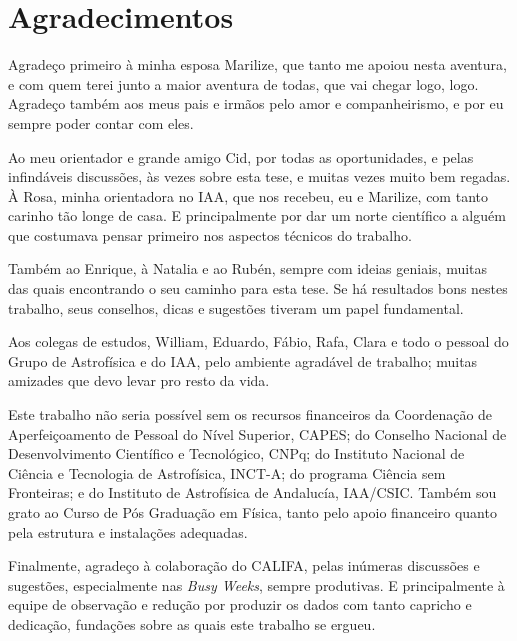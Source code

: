 


\chapter*{Agradecimentos}

Agradeço primeiro à minha esposa Marilize, que tanto me apoiou nesta aventura, e
com quem terei junto a maior aventura de todas, que vai chegar logo, logo. 
Agradeço também aos meus pais e irmãos pelo amor e companheirismo, e por eu
sempre poder contar com eles.

Ao meu orientador e grande amigo Cid, por todas as oportunidades, e pelas
infindáveis discussões, às vezes sobre esta tese, e muitas vezes muito bem
regadas. À Rosa, minha orientadora no IAA, que nos recebeu, eu e Marilize, com
tanto carinho tão longe de casa. E principalmente por dar um norte científico a
alguém que costumava pensar primeiro nos aspectos técnicos do trabalho.

Também ao Enrique, à Natalia e ao Rubén, sempre com ideias geniais, muitas das
quais encontrando o seu caminho para esta tese. Se há resultados bons nestes
trabalho, seus conselhos, dicas e sugestões tiveram um papel fundamental.

Aos colegas de estudos, William, Eduardo, Fábio, Rafa, Clara e todo o pessoal
do Grupo de Astrofísica e do IAA, pelo ambiente agradável de trabalho; muitas
amizades que devo levar pro resto da vida.

Este trabalho não seria possível sem os recursos financeiros da Coordenação de
Aperfeiçoamento de Pessoal do Nível Superior, CAPES; do Conselho Nacional de
Desenvolvimento Científico e Tecnológico, CNPq; do Instituto Nacional de Ciência
e Tecnologia de Astrofísica, INCT-A; do programa Ciência sem Fronteiras; e do
Instituto de Astrofísica de Andalucía, IAA/CSIC. Também sou grato ao Curso de
Pós Graduação em Física, tanto pelo apoio financeiro quanto pela estrutura e
instalações adequadas.

Finalmente, agradeço à colaboração do CALIFA, pelas inúmeras discussões e
sugestões, especialmente nas {\em Busy Weeks}, sempre produtivas. E
principalmente à equipe de observação e redução por produzir os dados com tanto
capricho e dedicação, fundações sobre as quais este trabalho se ergueu.

